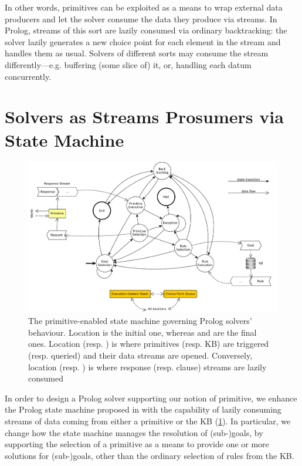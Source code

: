 \documentclass[12pt,a4paper,openright,twoside]{book}
\begin{document}
%
In other words, primitives can be exploited as a means to wrap external data producers and let the solver consume the data they produce via streams.
%
In Prolog, streams of this sort are lazily consumed via ordinary backtracking: the solver lazily generates a new choice point for each element in the stream and handles them as usual.
%
Solvers of different sorts may consume the stream differently---e.g. buffering (some slice of) it, or, handling each datum concurrently.

\section{Solvers as Streams Prosumers via State Machine}
\label{sec:state-machine}

\begin{figure}\centering
    \includegraphics[width=\linewidth]{figures/2p-fsa-dataflow}
    \caption[The primitive-enabled state machine governing Prolog solvers' behaviour]{The primitive-enabled state machine governing Prolog solvers' behaviour. Location  is the initial one, whereas  and  are the final ones. Location  (resp. )  is where primitives (resp. KB) are triggered (resp. queried) and their data streams are opened. Conversely, location  (resp. )  is where response (resp. clause) streams are lazily consumed}
    \label{fig:prolog-fsa}
\end{figure}

In order to design a Prolog solver supporting our notion of primitive, we enhance the Prolog state machine proposed in \cite{tuprolog-sac08} with the capability of lazily consuming streams of data coming from either a primitive or the KB (\cref{fig:prolog-fsa}).
%
In particular, we change how the state machine manages the resolution of (sub-)goals, by supporting the selection of a primitive as a means to provide one or more solutions for (sub-)goals, other than the ordinary selection of rules from the KB.
\end{document}
